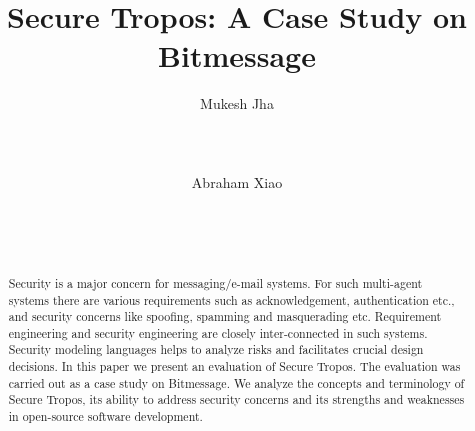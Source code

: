 \documentclass{acm_proc_article-sp}
\begin{document}
\title{Secure Tropos: A Case Study on Bitmessage}
\author{
\alignauthor
Mukesh Jha \\ %
       \\
       \\
       \\
\alignauthor
Abraham Xiao\\
  \\
       \\
       \\
}


\maketitle
\begin{abstract}
Security is a major concern for messaging/e-mail systems. For such multi-agent systems there are various requirements such as acknowledgement, authentication etc., and security concerns like spoofing, spamming and masquerading etc. Requirement engineering and security engineering are closely inter-connected in such systems. Security modeling languages helps to analyze risks and facilitates crucial design decisions. In this paper we present an evaluation of Secure Tropos. The evaluation was carried out as a case study on Bitmessage. We analyze the concepts and terminology of Secure Tropos, its ability to address security concerns and its strengths and weaknesses in open-source software development.

\end{abstract}

\end{document}
